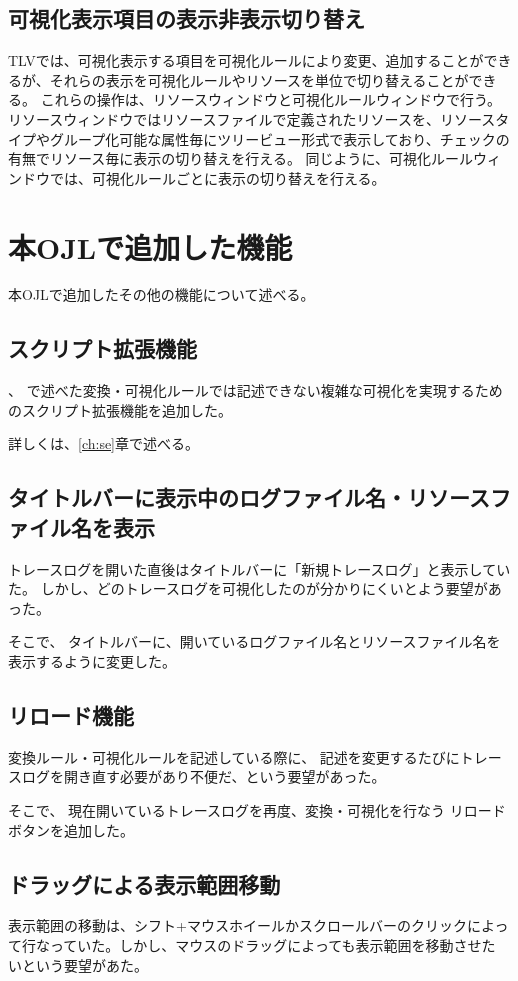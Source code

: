 \subsection{可視化表示項目の表示非表示切り替え}

TLVでは、可視化表示する項目を可視化ルールにより変更、追加することができるが、それらの表示を可視化ルールやリソースを単位で切り替えることができる。
これらの操作は、リソースウィンドウと可視化ルールウィンドウで行う。
リソースウィンドウではリソースファイルで定義されたリソースを、リソースタイプやグループ化可能な属性毎にツリービュー形式で表示しており、チェックの有無でリソース毎に表示の切り替えを行える。
同じように、可視化ルールウィンドウでは、可視化ルールごとに表示の切り替えを行える。

\section{本OJLで追加した機能}
本OJLで追加したその他の機能について述べる。

\subsection{スクリプト拡張機能}
、
で述べた変換・可視化ルールでは記述できない複雑な可視化を実現するためのスクリプト拡張機能を追加した。

詳しくは、\ref{ch:se}章で述べる。


\subsection{タイトルバーに表示中のログファイル名・リソースファイル名を表示}
トレースログを開いた直後はタイトルバーに「新規トレースログ」と表示していた。
しかし、どのトレースログを可視化したのが分かりにくいとよう要望があった。

そこで、
タイトルバーに、開いているログファイル名とリソースファイル名を表示するように変更した。

\subsection{リロード機能}
変換ルール・可視化ルールを記述している際に、
記述を変更するたびにトレースログを開き直す必要があり不便だ、という要望があった。

そこで、
現在開いているトレースログを再度、変換・可視化を行なう
リロードボタンを追加した。

\subsection{ドラッグによる表示範囲移動}
表示範囲の移動は、シフト+マウスホイールかスクロールバーのクリックによっ
て行なっていた。しかし、マウスのドラッグによっても表示範囲を移動させた
いという要望があた。

